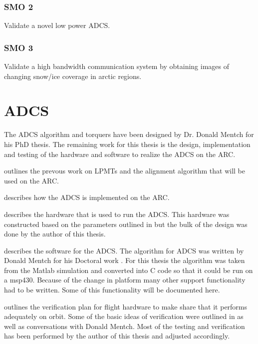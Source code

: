 \subsubsection{\acl{SMO} 2}

Validate a novel low power \ac{ADCS}.

\subsubsection{\acl{SMO} 3}

Validate a high bandwidth communication system by obtaining images of changing snow/ice coverage in arctic regions.

\section{\acl{ADCS}}

The \ac{ADCS} algorithm and torquers have been designed by Dr. Donald Mentch for his PhD thesis. The remaining work for this thesis is the design, implementation and testing of the hardware and software to realize the \ac{ADCS} on the \ac{ARC}.

 outlines the prevous work on \acp{LPMT} and the alignment algorithm that will be used on the \ac{ARC}.

 describes how the \ac{ADCS} is implemented on the \ac{ARC}. 

 describes the hardware that is used to run the \ac{ADCS}. This hardware was constructed based on the parameters outlined in \cite{Mentch11} but the bulk of the design was done by the author of this thesis.

 describes the software for the \ac{ADCS}. The algorithm for \ac{ADCS} was written by Donald Mentch for his Doctoral work \cite{Mentch11}. For this thesis the algorithm was taken from the Matlab simulation and converted into C code so that it could be run on a msp430. Because of the change in platform many other support functionality had to be written. Some of this functionality will be documented here.

 outlines the verification plan for flight hardware to make share that it performs adequately on orbit. Some of the basic ideas of verification were outlined in \cite{Mentch11} as well as conversations with Donald Mentch. Most of the testing and verification has been performed by the author of this thesis and adjusted accordingly.

